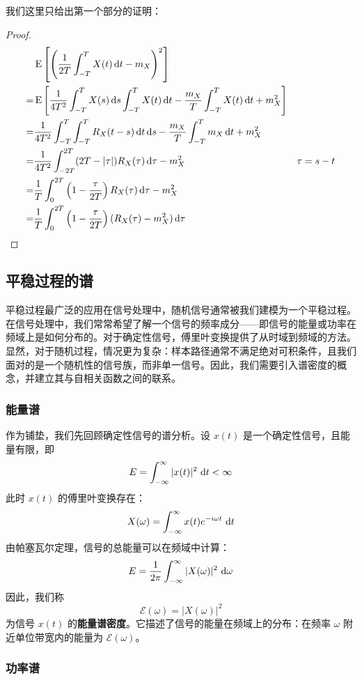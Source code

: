 我们这里只给出第一个部分的证明：
\begin{proof}
\begin{align*}
&\E\left[\left(\frac{1}{2T}\int_{-T}^{T}X(t)\dif t -m_X \right)^2\right]\\
=&\E\left[\frac{1}{4T^2}\int_{-T}^{T}X(s)\dif s\int_{-T}^{T}X(t)\dif t- \frac{m_X}{T}\int_{-T}^{T}X(t)\dif t+m_X^2 \right]\\
=&\frac{1}{4T^2}\int_{-T}^{T}\int_{-T}^{T}R_X(t-s)\dif t\dif s-\frac{m_X}{T}\int_{-T}^{T}m_X\dif t +m_X^2\\
=&\frac{1}{4T^2}\int_{-2T}^{2T}(2T-|\tau|)R_X(\tau)\dif \tau -m_X^2 & \tau=s-t\\
=&\frac{1}{T}\int_{0}^{2T}\left(1-\frac{\tau}{2T}\right)R_{X}(\tau)\dif \tau - m_X^2\\
=&\frac{1}{T}\int_{0}^{2T}\left(1-\frac{\tau}{2T}\right)(R_{X}(\tau) -m_X^2)\dif \tau \\
\end{align*}
\end{proof}

\subsection{平稳过程的谱}
平稳过程最广泛的应用在信号处理中，随机信号通常被我们建模为一个平稳过程。在信号处理中，我们常常希望了解一个信号的频率成分——即信号的能量或功率在频域上是如何分布的。对于确定性信号，傅里叶变换提供了从时域到频域的方法。显然，对于随机过程，情况更为复杂：样本路径通常不满足绝对可积条件，且我们面对的是一个随机性的信号族，而非单一信号。因此，我们需要引入谱密度的概念，并建立其与自相关函数之间的联系。

\subsubsection{能量谱}

作为铺垫，我们先回顾确定性信号的谱分析。设 \(x(t)\) 是一个确定性信号，且能量有限，即
\[
E = \int_{-\infty}^{\infty} |x(t)|^2 \, \mathop{}\!\mathrm{d} t < \infty
\]
此时 \(x(t)\) 的傅里叶变换存在：
\[
X(\omega) = \int_{-\infty}^{\infty} x(t) e^{-i\omega t} \, \mathop{}\!\mathrm{d} t
\]
由帕塞瓦尔定理，信号的总能量可以在频域中计算：
\[
E = \frac{1}{2\pi} \int_{-\infty}^{\infty} |X(\omega)|^2 \, \mathop{}\!\mathrm{d} \omega
\]
因此，我们称
\[
\mathcal{E}(\omega) = |X(\omega)|^2
\]
为信号 \(x(t)\) 的\textbf{能量谱密度}。它描述了信号的能量在频域上的分布：在频率 \(\omega\) 附近单位带宽内的能量为 \(\mathcal{E}(\omega)\)。

\subsubsection{功率谱}

